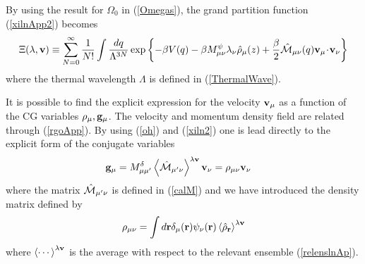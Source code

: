 \documentclass[b5paper,openright,11pt]{book}
\newcommand{\esc}{\!\cdot\!}
\newcommand{\llangle}{\left\langle}
\newcommand{\rrangle}{\right\rangle}
\begin{document}
\begin{appendices}
By using the result for $\Omega_0$ in (\ref{Omegas}),  the  grand  partition  function
(\ref{xilnApp2}) becomes
\begin{align}
\Xi(\lambda,{\bf v})\equiv \sum_{N=0}^\infty \frac{1}{N!}
\int \frac{dq}{\Lambda^{3N}}
\exp\left\{-\beta V(q)-\beta M^\psi_{\mu\nu}\lambda_\nu\hat{\rho}_{\mu}(z)+\frac{\beta}{2}\hat{\cal M}_{\mu\nu}(q){\bf v}_\mu \esc{\bf v}_\nu
\right\}
\label{xiln2b}
\end{align}
where the thermal wavelength $\Lambda$ is  defined in (\ref{ThermalWave}).



It is possible to find the  explicit expression for the velocity ${\bf
  v}_\mu$ as  a function of  the CG variables  $\rho_\mu,{\bf g}_\mu$.
The  velocity   and  momentum   density  field  are   related  through
(\ref{rgoApp}).   By  using  (\ref{oh})  and (\ref{xiln2})  one  is  lead
directly to the explicit form of the conjugate variables
\begin{align}
{\bf g}_\mu&=M^\delta_{\mu\mu'}\llangle \hat{\cal M}_{\mu'\nu}\rrangle^{\lambda {\bf v}} {\bf v}_\nu =\rho_{\mu\nu}{\bf v}_\nu
\label{nu2}
\end{align}
where the  matrix $\hat{\cal M}_{\mu'\nu}$ is  defined in (\ref{calM})
and we have introduced the density matrix defined by
\begin{align}
  \rho_{\mu\nu} =\int d{\bf r}
\delta_\mu({\bf r})\psi_\nu({\bf r})\llangle\hat{\rho}_{\bf r}\rrangle^{\lambda{\bf v}}
\end{align}
where $\llangle\cdots\rrangle^{\lambda{\bf v}}$  is the average  with respect
to   the  relevant   ensemble   (\ref{relenslnAp}). 


\end{appendices}
\end{document}
